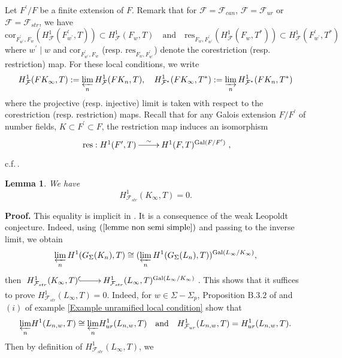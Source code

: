 \documentclass[reqno]{amsart}
\newcounter{dummy} \numberwithin{dummy}{section}
\newtheorem{lem}[dummy]{Lemma}
\begin{document}
Let $F^{\prime}/F$ be a finite extension of $F$. Remark that for
$\mathcal{F}=\mathcal{F}_{can}$, $\mathcal{F}=\mathcal{F}_{ur}$ or
$\mathcal{F}=\mathcal{F}_{str}$, we have
$$
\mathrm{cor}_{F^{\prime}_{w^{\prime}},F_{w}}(H^{1}_{\mathcal{F}}(F^{\prime}_{w^{\prime}},T))\subset
H^{1}_{\mathcal{F}}(F_{w},T)\quad \mbox{and}\quad
\mathrm{res}_{F_{w},F^{\prime}_{w^{\prime}}}(H^{1}_{\mathcal{F}}(F_{w},T^{\ast}))\subset
H^{1}_{\mathcal{F}}(F^{\prime}_{w^{\prime}},T^{\ast})
$$
where $w^{\prime}\mid w$ and
$\mathrm{cor}_{F^{\prime}_{w^{\prime}},F_{w}}$ (resp.
$\mathrm{res}_{F_{w},F^{\prime}_{w^{\prime}}}$) denote the
corestriction (resp.  restriction) map. For these  local conditions,
we write
$$
H^{1}_{\mathcal{F}}(FK_{\infty},T):=\varprojlim_{n}H^{1}_{\mathcal{F}}(FK_{n},T),\quad
H^{1}_{\mathcal{F}^{\ast}}(FK_{\infty},T^{\ast}):=\varinjlim_{n}H^{1}_{\mathcal{F}^{\ast}}(FK_{n},T^{\ast})
$$
 where the projective (resp. injective) limit is taken with respect to
 the corestriction (resp. restriction) maps.\vskip 6pt
 Recall that for any Galois extension $F/F^{\prime}$ of number
 fields, $K\subset F^{\prime}\subset F$, the restriction map induces an isomorphism
 \begin{equation}\label{lemme non semi simple}
\xymatrix@=2pc{ \mathrm{res}: H^{1}(F^{\prime},T)\ar[r]^-{\sim}&
H^{1}(F,T)^{\mathrm{Gal}(F/F^{\prime})}},
 \end{equation}
 c.f.\,\cite[Lemme 4.3]{AMO1}.
\begin{lem}\label{Leopoldt}
 We have
$$
H^{1}_{\mathcal{F}_{str}}(K_{\infty},T)=0.
$$
\end{lem}
\noindent \textbf{Proof.} This equality is implicit in
\cite[Proposition 2.12]{Kazim109}. It is a consequence of the weak
Leopoldt conjecture. Indeed, using $(\ref{lemme non semi simple})$
and passing to the inverse limit, we obtain
$$
\varprojlim_{n} H^{1}(G_{\Sigma}(K_{n}),T)\cong(\varprojlim_{n}
H^{1}(G_{\Sigma}(L_{n}),T))^{\mathrm{Gal}(L_{\infty}/K_{\infty})},
$$
then $\xymatrix@=2pc{
H^{1}_{\mathcal{F}_{str}}(K_{\infty},T)\ar@{^{(}->}[r]&
H^{1}_{\mathcal{F}_{str}}(L_{\infty},T)^{\mathrm{Gal}(L_{\infty}/K_{\infty})}}$.
This shows that it suffices to prove
$H^{1}_{\mathcal{F}_{str}}(L_{\infty},T)=0$. Indeed, for
$w\in\Sigma-\Sigma_{p}$, Proposition $\mathrm{B}.3.2$ of
\cite{Rubin00} and $(i)$ of  example \ref{Example unramified local
condition} show that
$$\displaystyle{\varprojlim_{n}}H^{1}(L_{n,w},T)\cong
\displaystyle{\varprojlim_{n}}H^{1}_{ur}(L_{n,w},T)
\quad\mbox{and}\quad
H^{1}_{\mathcal{F}_{ur}}(L_{n,w},T)=H^{1}_{ur}(L_{n,w},T).
$$
Then by definition of $H^{1}_{\mathcal{F}_{str}}(L_{\infty},T)$, we
\end{document}
